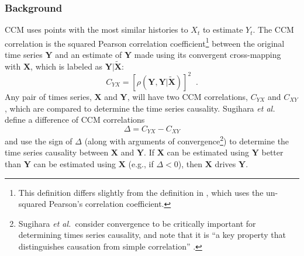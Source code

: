 \documentclass{article}[10pt]
\begin{document}
\subsubsection{Background}
CCM uses points with the most similar histories to $X_t$ to estimate $Y_t$.  The CCM correlation is the squared Pearson correlation coefficient\footnote{This definition differs slightly from the definition in \cite{Sugihara2012}, which uses the un-squared Pearson’s correlation coefficient.} between the original time series $\mathbf{Y}$ and an estimate of $\mathbf{Y}$ made using its convergent cross-mapping with $\mathbf{X}$, which is labeled as $\mathbf{Y}|\tilde{\mathbf{X}}$:
\begin{equation}
C_{YX} = \left[\rho(\mathbf{Y},\mathbf{Y}|\tilde{\mathbf{X}})\right]^2\;\;.
\end{equation}
Any pair of times series, $\mathbf{X}$ and $\mathbf{Y}$, will have two CCM correlations, $C_{YX}$ and $C_{XY}$, which are compared to determine the time series causality.  Sugihara {\em et al.\ }\cite{Sugihara2012} define a difference of CCM correlations
\begin{equation}
\label{eqn:delta}
\Delta = C_{YX} - C_{XY}
\end{equation}
and use the sign of $\Delta$ (along with arguments of convergence\footnote{Sugihara {\em et al.\ }consider convergence to be critically important for determining times series causality, and note that it is ``a key property that distinguishes causation from simple correlation'' \cite{Sugihara2012}.}) to determine the time series causality between $\mathbf{X}$ and $\mathbf{Y}$.  If $\mathbf{X}$ can be estimated using $\mathbf{Y}$ better than $\mathbf{Y}$ can be estimated using $\mathbf{X}$ (e.g., if $\Delta < 0$), then $\mathbf{X}$ drives $\mathbf{Y}$.
\end{document}
